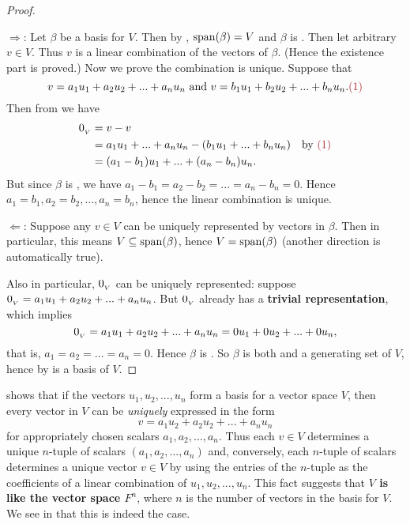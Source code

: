\begin{proof}\ 

\(\Longrightarrow\):
Let \(\beta\) be a basis for \(V\).
Then by , \(\operatorname{span}(\beta) = V\) and \(\beta\) is \LID{}.
Then let arbitrary \(v \in V\).
Thus \(v\) is a linear combination of the vectors of \(\beta\).
(Hence the existence part is proved.)
Now we prove the combination is unique.
Suppose that
\[
    v = a_1 u_1 + a_2 u_2 + ... + a_n u_n \text{ and } v = b_1 u_1 + b_2 u_2 + ... + b_n u_n. \MAROON{(1)}
\]
Then from  we have
\begin{align*}
    \OV & = v - v \\
        & = a_1 u_1 + ... + a_n u_n - (b_1 u_1 + ... + b_n u_n) & \text{by \MAROON{(1)}} \\
        & = (a_1 - b_1) u_1 + ... + (a_n - b_n) u_n.
\end{align*}
But since \(\beta\) is \LID{}, we have \(a_1 - b_1 = a_2 - b_2 = ... = a_n - b_n = 0\).
Hence \(a_1 = b_1, a_2 = b_2, ..., a_n = b_n\), hence the linear combination is unique.

\(\Longleftarrow\):
Suppose any \(v \in V\) can be uniquely represented by vectors in \(\beta\).
Then in particular, this means \(V \subseteq \operatorname{span}(\beta)\), hence \(V = \operatorname{span}(\beta)\) (another direction is automatically true).

Also in particular, \(0_{_V}\) can be uniquely represented:
suppose \(0_{_V} = a_1 u_1 + a_2 u_2 + ... + a_n u_n\).
But \(0_{_V}\) already has a \textbf{trivial representation}, which implies
\[
    0_{_V} = a_1 u_1 + a_2 u_2 + ... + a_n u_n = 0 u_1 + 0 u_2 + ... + 0 u_n,
\]
that is, \(a_1 = a_2 = ... = a_n = 0\).
Hence \(\beta\) is \LID{}.
So \(\beta\) is both \LID{} and a generating set of \(V\), hence by  is a basis of \(V\).
\end{proof}

\begin{note}
 shows that if the vectors \(u_1, u_2, ..., u_n\) form a basis for a vector space \(V\), then every vector in \(V\) can be \emph{uniquely} expressed in the form
\[
    v = a_1 u_2 + a_2 u_2 + ... + a_n u_n
\]
for appropriately chosen scalars \(a_1, a_2, ..., a_n\).
Thus each \(v \in V\) determines a unique \(n\)-tuple of scalars \((a_1, a_2, ..., a_n)\) and,
conversely, each \(n\)-tuple of scalars determines a unique vector \(v \in V\) by using the entries of the \(n\)-tuple as the coefficients of a linear combination of \(u_1, u_2, ..., u_n\).
This fact suggests that \textbf{\(V\) is like the vector space \(F^n\)}, where \(n\) is the number of vectors in the basis for \(V\).
We see in  that this is indeed the case.
\end{note}

